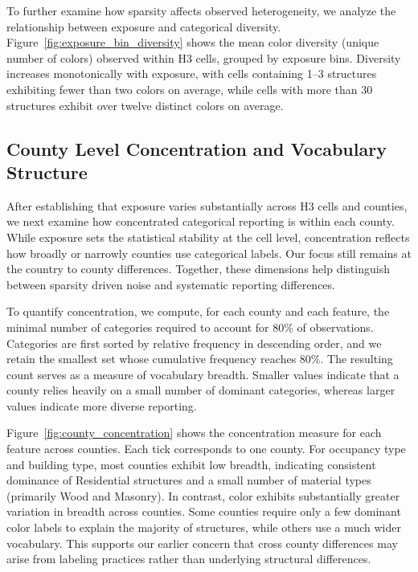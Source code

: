 \documentclass[11pt,letterpaper]{article}
\begin{document}
To further examine how sparsity affects observed heterogeneity, we analyze the relationship between exposure and categorical diversity. Figure~\ref{fig:exposure_bin_diversity} shows the mean color diversity (unique number of colors) observed within H3 cells, grouped by exposure bins. Diversity increases monotonically with exposure, with cells containing 1–3 structures exhibiting fewer than two colors on average, while cells with more than 30 structures exhibit over twelve distinct colors on average.


\subsection{County Level Concentration and Vocabulary Structure}

After establishing that exposure varies substantially across H3 cells and counties, we next examine how concentrated categorical reporting is within each county. While exposure sets the statistical stability at the cell level, concentration reflects how broadly or narrowly counties use categorical labels. Our focus still remains at the country to county differences. Together, these dimensions help distinguish between sparsity driven noise and systematic reporting differences.

To quantify concentration, we compute, for each county and each feature, the minimal number of categories required to account for 80\% of observations. Categories are first sorted by relative frequency in descending order, and we retain the smallest set whose cumulative frequency reaches 80\%. The resulting count serves as a measure of vocabulary breadth. Smaller values indicate that a county relies heavily on a small number of dominant categories, whereas larger values indicate more diverse reporting.

Figure~\ref{fig:county_concentration} shows the concentration measure for each feature across counties. Each tick corresponds to one county. For occupancy type and building type, most counties exhibit low breadth, indicating consistent dominance of Residential structures and a small number of material types (primarily Wood and Masonry). In contrast, color exhibits substantially greater variation in breadth across counties. Some counties require only a few dominant color labels to explain the majority of structures, while others use a much wider vocabulary. This supports our earlier concern that cross county differences may arise from labeling practices rather than underlying structural differences.
\end{document}
